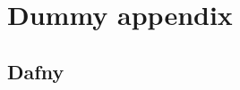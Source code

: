 \documentclass[12pt,openany,a4paper]{book}
\begin{document}


\chapter{Dummy appendix}

\section{Dafny}


\label {dafnybug1}
\end{document}
